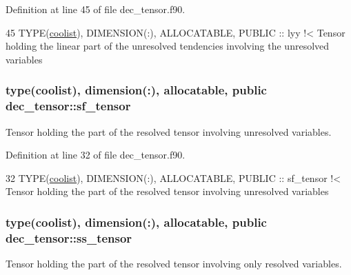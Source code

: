Definition at line 45 of file dec\+\_\+tensor.\+f90.


\begin{DoxyCode}
45   \textcolor{keywordtype}{TYPE}(\hyperlink{structtensor_1_1coolist}{coolist}), \textcolor{keywordtype}{DIMENSION(:)}, \textcolor{keywordtype}{ALLOCATABLE}, \textcolor{keywordtype}{PUBLIC} :: lyy\textcolor{comment}{ !< Tensor holding the linear part of the
       unresolved tendencies involving the unresolved variables}
\end{DoxyCode}
\subsubsection[{\texorpdfstring{sf\+\_\+tensor}{sf_tensor}}]{\setlength{\rightskip}{0pt plus 5cm}type({\bf coolist}), dimension(\+:), allocatable, public dec\+\_\+tensor\+::sf\+\_\+tensor}\hypertarget{namespacedec__tensor_a3f0627e15eba5158920d63deec399669}{}\label{namespacedec__tensor_a3f0627e15eba5158920d63deec399669}


Tensor holding the part of the resolved tensor involving unresolved variables. 



Definition at line 32 of file dec\+\_\+tensor.\+f90.


\begin{DoxyCode}
32   \textcolor{keywordtype}{TYPE}(\hyperlink{structtensor_1_1coolist}{coolist}), \textcolor{keywordtype}{DIMENSION(:)}, \textcolor{keywordtype}{ALLOCATABLE}, \textcolor{keywordtype}{PUBLIC} :: sf\_tensor\textcolor{comment}{ !< Tensor holding the part of the
       resolved tensor involving unresolved variables}
\end{DoxyCode}
\subsubsection[{\texorpdfstring{ss\+\_\+tensor}{ss_tensor}}]{\setlength{\rightskip}{0pt plus 5cm}type({\bf coolist}), dimension(\+:), allocatable, public dec\+\_\+tensor\+::ss\+\_\+tensor}\hypertarget{namespacedec__tensor_a1e5a6c8bbb0cfa7d44245e0567b4ffca}{}\label{namespacedec__tensor_a1e5a6c8bbb0cfa7d44245e0567b4ffca}


Tensor holding the part of the resolved tensor involving only resolved variables. 



